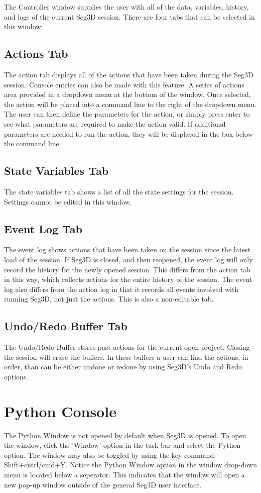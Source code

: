 \documentclass[fleqn,11pt,openany]{book}
\begin{document}
The Controller window supplies the user with all of the data, variables, history, and logs of the current Seg3D session.
There are four tabs that can be selected in this window:

\subsection{Actions Tab}
The action tab displays all of the actions that have been taken during the Seg3D session.
Console entries can also be made with this feature.
A series of actions area provided in a dropdown menu at the bottom of the window.
Once selected, the action will be placed into a command line to the right of the dropdown menu.
The user can then define the parameters for the action, or simply press enter to see what parameters are required to make the action valid.
If additional parameters are needed to run the action, they will be displayed in the box below the command line.

\subsection{State Variables Tab}
The state variables tab  shows a list of all the state settings for the session.
Settings cannot be edited in this window.

\subsection{Event Log Tab}
The event log shows actions that have been taken on the session since the latest load of the session.
If Seg3D is closed, and then reopened, the event log will only record the history for the newly opened session.
This differs from the action tab in this way, which collects actions for the entire history of the session.
The event log also differs from the action log in that it records all events involved with running Seg3D, not just the actions.
This is also a non-editable tab.

\subsection{Undo/Redo Buffer Tab}
The Undo/Redo Buffer stores past actions for the current open project.
Closing the session will erase the buffers.
In these buffers a user can find the actions, in order, than can be either undone or redone by using Seg3D's Undo and Redo options.


\section{Python Console}
The Python Window is not opened by default when Seg3D is opened.  To open the window, click the 'Window' option in the task bar and select the Python option.  The window may also be toggled by using the key command: Shift+cntrl/cmd+Y.
Notice the Python Window option in the window drop-down menu is located below a seperator.  
This indicates that the window will open a new pop-up window outside of the general Seg3D user interface.
\end{document}
